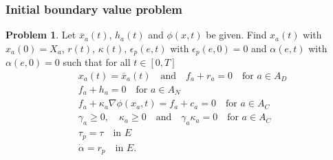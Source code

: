 \documentclass[8pt]{beamer}
\numberwithin{equation}{section}
\theoremstyle{definition}
\newtheorem{prb}[prop]{Problem}
\begin{document}
\begin{frame}
\frametitle{Initial boundary value problem}
\begin{prb}
Let $\overline{x}_a(t)$, $h_a(t)$ and $\phi(x,t)$ be given. Find $x_a(t)$ with $x_a(0)=X_a$, $r(t)$, $\kappa(t)$, $\epsilon_p(e,t)$ with $\epsilon_p(e,0)=0$ and $\alpha(e,t)$ with $\alpha(e,0)=0$ such that for all $t\in[0,T]$
\begin{align*}
&x_a(t)=\overline{x}_a(t)\quad\text{and}\quad f_a+r_a=0\quad\text{for $a\in A_D$} \\
&f_a+h_a=0\quad\text{for $a\in A_N$} \\
&f_a+\kappa_a\nabla\phi(x_a,t)=f_a+c_a=0\quad\text{for $a\in A_C$} \\
&\gamma_a\ge0,\quad \kappa_a\ge 0\quad\text{and}\quad\gamma_a\kappa_a=0\quad\text{for $a\in A_C$} \\
&\tau_p=\tau\quad\text{in $E$} \\
&\dot\alpha=r_p\quad\text{in $E$}.
\end{align*}
\end{prb}
\end{frame}
\end{document}
